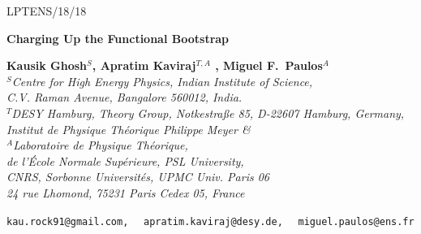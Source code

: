 \documentclass[12pt]{article}
\numberwithin{equation}{section}
\begin{document}
	
	\vspace*{-.6in} \thispagestyle{empty}
	\begin{flushright}
		LPTENS/18/18
	\end{flushright}
	\vspace{1cm} {\Large
		\begin{center}
			{\bf Charging Up the Functional Bootstrap}\\
	\end{center}}
	\vspace{1cm}
	\begin{center}
		{\bf Kausik Ghosh${}^{S} $, Apratim Kaviraj${}^{T,A} $ , Miguel F.~Paulos${}^{A}$ }\\[1cm] 
		{
			\small
			{\em  ${}^{S} $Centre for High Energy Physics,
				 Indian Institute of Science,\\  C.V. Raman Avenue, Bangalore 560012, India. \\ ${}^T$DESY Hamburg, Theory Group, Notkestra\ss e 85, D-22607 Hamburg, Germany,\\
				 Institut de Physique Th\'{e}orique Philippe Meyer \&  \\
				 ${}^A$Laboratoire de Physique Th\'eorique, \\ de l'\'Ecole Normale Sup\'erieure, PSL University,\\ CNRS, Sorbonne Universit\'es, UPMC Univ. Paris 06\\ 24 rue Lhomond, 75231 Paris Cedex 05, France
			}
			\normalsize
		}
		\\
	\end{center}
	
	\begin{center}
		{\texttt{kau.rock91@gmail.com,} \ \ \texttt{apratim.kaviraj@desy.de,} \ \  \texttt{miguel.paulos@ens.fr} 
		}
		\\
	\end{center}
	
	\vspace{4mm}
	
	\begin{abstract}
		We revisit the problem of bootstrapping CFT correlators of charged fields. After discussing in detail how bounds for uncharged fields can be recycled to the charged case, we introduce two sets of analytic functional bases for correlators on the line. The first, which we call ``simple'', is essentially a direct sum of analytic functionals for the uncharged case. We use it to establish very general bounds on the OPE density appearing in charged correlators. The second basis is dual to generalized free fields and we explain how it is related to a charged version of the Polyakov bootstrap. We apply these functionals to map out the space of correlators and obtain new improved bounds on the 3d Ising twist defect.
	\end{abstract}
	\vspace{2in}
	
\end{document}
